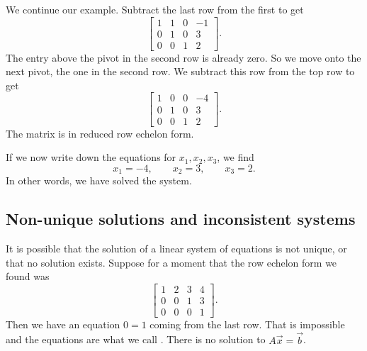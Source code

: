 We continue our example.
Subtract the last row from the first to get
\begin{equation*}
\left[
\begin{array}{ccc|c}
1 & 1 & 0 & -1 \\
0 & 1 & 0 & 3 \\
0 & 0 & 1 & 2 
\end{array}
\right] .
\end{equation*}
The entry above the pivot in the second row is already zero.
So we move onto the next pivot, the one in the second row.  We subtract
this row from the top row to get
\begin{equation*}
\left[
\begin{array}{ccc|c}
1 & 0 & 0 & -4 \\
0 & 1 & 0 & 3 \\
0 & 0 & 1 & 2 
\end{array}
\right] .
\end{equation*}
The matrix is in reduced row echelon form.

If we now write down the equations for $x_1,x_2,x_3$, we find
\begin{equation*}
x_1 = -4, \qquad x_2 = 3, \qquad x_3 = 2 .
\end{equation*}
In other words, we have solved the system.

\subsection{Non-unique solutions and inconsistent systems}

It is
possible that the solution of a linear system of equations
is not unique, or that no solution exists.  Suppose for a moment
that the row echelon form we found was
\begin{equation*}
\left[
\begin{array}{ccc|c}
1 & 2 & 3 & 4 \\
0 & 0 & 1 & 3 \\
0 & 0 & 0 & 1 
\end{array}
\right] .
\end{equation*}
Then we have an equation $0=1$ coming from the last row.  That is impossible
and the equations are what we call \emph{}.  There is no solution
to $A \vec{x} = \vec{b}$.



